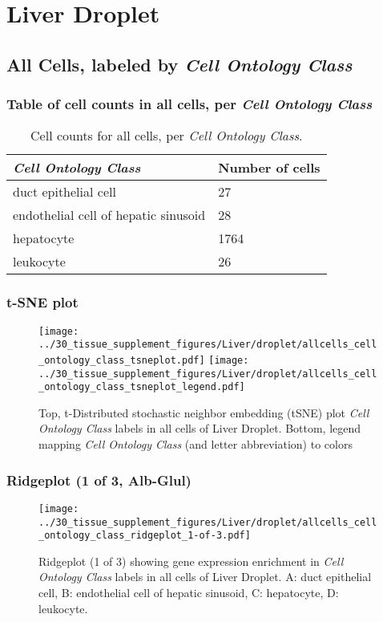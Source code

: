\clearpage
\section{Liver Droplet}

\subsection{All Cells, labeled by \emph{Cell Ontology Class}}
\subsubsection{Table of cell counts in all cells, per \emph{Cell Ontology Class}}\begin{table}[h]
\centering
\label{my-label}
\begin{tabular}{@{}ll@{}}
\toprule

\emph{Cell Ontology Class}& Number of cells \\ \midrule
duct epithelial cell & 27 \\

endothelial cell of hepatic sinusoid & 28 \\

hepatocyte & 1764 \\

leukocyte & 26 \\
\bottomrule
\end{tabular}
\caption{Cell counts for all cells, per \emph{Cell Ontology Class}.}
\end{table}

\clearpage
\subsubsection{t-SNE plot}
\begin{figure}[h]
\centering
\texttt{[image: ../30\_tissue\_supplement\_figures/Liver/droplet/allcells\_cell\_ontology\_class\_tsneplot.pdf]}
\texttt{[image: ../30\_tissue\_supplement\_figures/Liver/droplet/allcells\_cell\_ontology\_class\_tsneplot\_legend.pdf]}
\caption{Top, t-Distributed stochastic neighbor embedding (tSNE) plot  \emph{Cell Ontology Class} labels in all cells of Liver Droplet. Bottom, legend mapping \emph{Cell Ontology Class} (and letter abbreviation) to colors}
\end{figure}


\clearpage

\subsubsection{Ridgeplot (1 of 3, Alb-Glul)}
\begin{figure}[h]
\centering
\texttt{[image: ../30\_tissue\_supplement\_figures/Liver/droplet/allcells\_cell\_ontology\_class\_ridgeplot\_1-of-3.pdf]}

\caption{ Ridgeplot (1 of 3)  showing gene expression enrichment in \emph{Cell Ontology Class} labels in all cells of Liver Droplet. A: duct epithelial cell, B: endothelial cell of hepatic sinusoid, C: hepatocyte, D: leukocyte.}
\end{figure}


